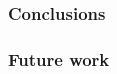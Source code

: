 \begin{frame}[t]
	\frametitle{Conclusions}

\end{frame}
\begin{frame}[t]
	\frametitle{Future work}

\end{frame}
